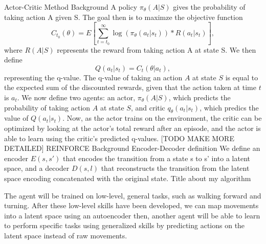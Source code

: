 \documentclass[a4paper]{article}
\begin{document}
\large 
Actor-Critic Method Background\linebreak
\normalsize
A policy $\pi_\theta(A|S)$ gives the probability of taking action A given S.\linebreak
The goal then is to maximze the objective function 
$$C_{t_0}(\theta) = E[\sum_{t=t_0}^{\infty} \log(\pi_\theta(a_t|s_t)) * R(a_t|s_t)],$$
where $R(A|S)$ represents the reward from taking action A at state S. We then define 
$$Q(a_t|s_t) = C_{t}(\theta|a_t),$$
representing the q-value. The q-value of taking an action $A$ at state $S$ is equal to the expected sum of the discounted rewards, 
given that the action taken at time $t$ is $a_t$.
We now define two agents: an actor, $\pi_\theta(A|S)$, which predicts the probability of taking action $A$ at state $S$, and critic $q_\theta(a_t|s_t)$,
which predics the value of $Q(a_t|s_t)$. Now, as the actor trains on the environment, the critic can be optimized by looking at the actor's total reward after an episode,
and the actor is able to learn using the critic's predicted q-values. [TODO MAKE MORE DETAILED]\linebreak
\large
REINFORCE Background
\linebreak
\large Encoder-Decoder definition
\normal
We define an encoder $E(s, s')$ that encodes the transition from a state s to s' into a latent space, and a decoder $D(s, l)$ that reconstructs 
the transition from the latent space encoding concatenated with the original state.
\large
Title about my algorithm
\normalsize

The agent will be trained on low-level, general tasks, such as walking forward and turning.
After these low-level skills have been developed, we can map movements into a latent space using an autoencoder
then, another agent will be able to learn to perform specific tasks using generalized skills by 
predicting actions on the latent space instead of raw movements.
\end{document}
